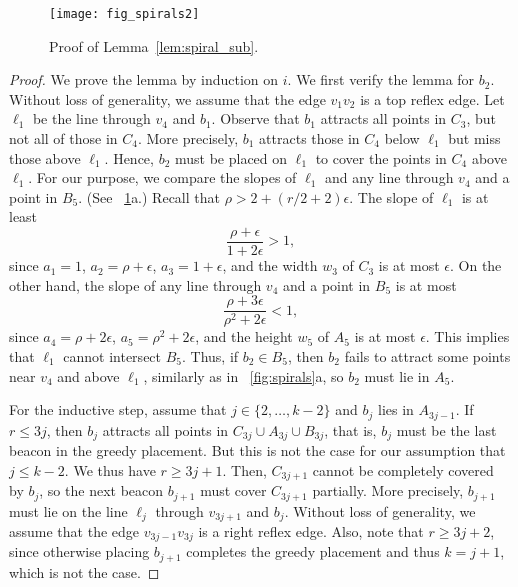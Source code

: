 \documentclass[11pt]{article}
\theoremstyle{definition}
\let\geq\geqslant
\let\leq\leqslant
\begin{document}
\begin{figure}[tb]
\centering
\texttt{[image: fig\_spirals2]}
\caption{Proof of Lemma~\ref{lem:spiral_sub}.}
\label{fig:spirals2}
\end{figure}

\begin{proof}
We prove the lemma by induction on $i$.
We first verify the lemma for $b_2$.
Without loss of generality, we assume that the edge $v_1v_2$ is a top reflex edge.
Let $\ell_1$ be the line through $v_4$ and $b_1$.
Observe that $b_1$ attracts all points in $C_3$, but not all of those in $C_4$.
More precisely, $b_1$ attracts those in $C_4$ below $\ell_1$ but miss those above $\ell_1$.
Hence, $b_2$ must be placed on $\ell_1$ to cover the points in $C_4$ above $\ell_1$.
For our purpose, we compare the slopes of $\ell_1$ and any line through $v_4$ and a point in $B_5$.
(See \figurename~\ref{fig:spirals2}a.)
Recall that $\rho > 2 + (r / 2 + 2)\epsilon$.
The slope of $\ell_1$ is at least
\[ \frac{\rho + \epsilon}{1+ 2\epsilon} > 1, \]
since $a_1 = 1$, $a_2 = \rho + \epsilon$, $a_3 = 1 + \epsilon$, and
the width $w_3$ of $C_3$ is at most $\epsilon$.
On the other hand, the slope of any line through $v_4$ and a point in $B_5$ is at most
\[ \frac{\rho + 3\epsilon}{\rho^2 + 2\epsilon} < 1,\]
since $a_4 = \rho + 2\epsilon$, $a_5 = \rho^2 + 2\epsilon$, and the height $w_5$ of $A_5$
is at most $\epsilon$.
This implies that $\ell_1$ cannot intersect $B_5$.
Thus, if $b_2\in B_5$, then $b_2$ fails to attract some points near $v_4$ and above $\ell_1$,
similarly as in \figurename~\ref{fig:spirals}a, so $b_2$ must lie in $A_5$.

For the inductive step, assume that $j \in \{2, \ldots, k-2\}$ and $b_j$  lies in $A_{3j-1}$.
If $r \leq 3j$, then $b_j$ attracts all points in $C_{3j} \cup A_{3j} \cup B_{3j}$,
that is, $b_j$ must be the last beacon in the greedy placement.
But this is not the case for our assumption that $j \leq k-2$.
We thus have $r \geq 3j + 1$.
Then, $C_{3j+1}$ cannot be completely covered by $b_j$, so the next beacon $b_{j+1}$
must cover $C_{3j+1}$ partially.
More precisely, $b_{j+1}$ must lie on the line $\ell_j$ through $v_{3j+1}$ and $b_j$.
Without loss of generality, we assume that the edge $v_{3j-1}v_{3j}$ is a right reflex edge.
Also, note that $r \geq 3j + 2$, since otherwise placing $b_{j+1}$ completes the greedy placement
and thus $k = j+1$, which is not the case.


\end{proof}
\end{document}
